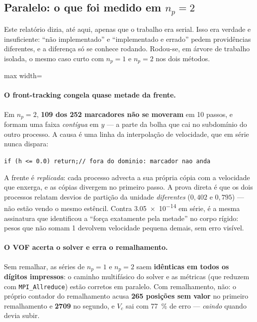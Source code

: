 \subsection{Paralelo: o que foi medido em $n_p=2$}
\label{sec:paralelo}

Este relat\'orio dizia, at\'e aqui, apenas que o trabalho era serial. Isso era
verdade e insuficiente: ``n\~ao implementado'' e ``implementado e errado'' pedem
provid\^encias diferentes, e a diferen\c{c}a s\'o se conhece rodando. Rodou-se,
em \'arvore de trabalho isolada, o mesmo caso curto com $n_p=1$ e $n_p=2$ nos
dois m\'etodos.

\begin{adjustbox}{max width=\linewidth}
\end{adjustbox}

\paragraph{O front-tracking congela quase metade da frente.} Em $n_p=2$,
\textbf{109 dos 252 marcadores n\~ao se moveram} em 10 passos, e formam uma faixa
\emph{cont\'igua} em $y$ --- a parte da bolha que cai no subdom\'inio do outro
processo. A causa \'e uma linha da interpola\c{c}\~ao de velocidade, que em s\'erie
nunca dispara:
\begin{center}
\texttt{if (h <= 0.0) return;\qquad // fora do dominio: marcador nao anda}
\end{center}
A frente \'e \emph{replicada}: cada processo advecta a sua pr\'opria c\'opia com
a velocidade que enxerga, e as c\'opias divergem no primeiro passo. A prova
direta \'e que os dois processos relatam desvios de parti\c{c}\~ao da unidade
\emph{diferentes} ($0{,}402$ e $0{,}795$) --- n\~ao est\~ao vendo o mesmo
est\^encil. Contra \num{3.05e-14} em s\'erie, \'e a mesma assinatura que
identificou a ``for\c{c}a exatamente pela metade'' no corpo r\'igido: pesos que
n\~ao somam 1 devolvem velocidade pequena demais, sem erro vis\'ivel.

\paragraph{O VOF acerta o solver e erra o remalhamento.} Sem remalhar, as
s\'eries de $n_p=1$ e $n_p=2$ saem \textbf{id\^enticas em todos os d\'igitos
impressos}: o caminho multif\'asico do solver e as m\'etricas (que reduzem com
\texttt{MPI\_Allreduce}) est\~ao corretos em paralelo. Com remalhamento, n\~ao:
o pr\'oprio contador do remalhamento acusa \textbf{265 posi\c{c}\~oes sem valor}
no primeiro remalhamento e \textbf{2709} no segundo, e $V_c$ sai com
\SI{77}{\percent} de erro --- \emph{caindo} quando devia subir.

